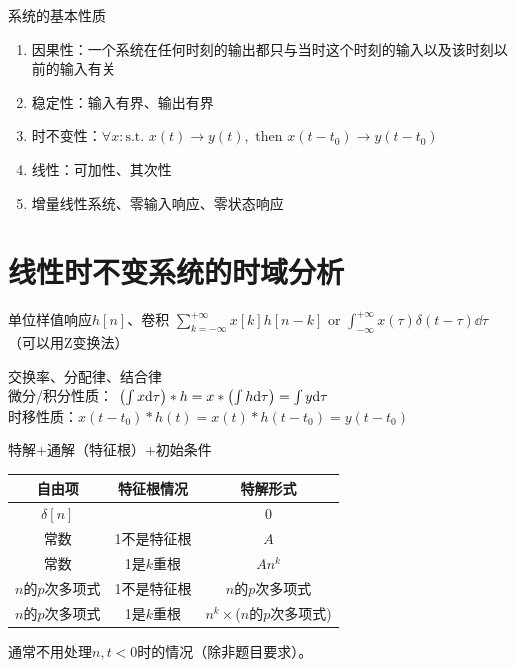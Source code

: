 \documentclass{article}
\begin{document}
\begin{prt}系统的基本性质
	\begin{enumerate}
		\item 因果性：一个系统在任何时刻的输出都只与当时这个时刻的输入以及该时刻以前的输入有关
		\item 稳定性：输入有界、输出有界
		\item 时不变性：$\forall x:\mbox{s.t. }x(t)\to y(t),\mbox{ then } x(t-t_0)\to y(t-t_0)$
		\item 线性：可加性、其次性
		\item 增量线性系统、零输入响应、零状态响应
	\end{enumerate}
\end{prt}









\section{线性时不变系统的时域分析}

\begin{defi}
	单位样值响应$h[n]$、卷积
	$\sum_{k=-\infty}^{+\infty}x[k]h[n-k]$ or 
	$\int_{-\infty}^{+\infty}x(\tau)\delta(t-\tau)\dd\tau$
	（可以用Z变换法）
\end{defi}

\begin{prt}[卷积]
    交换率、分配律、结合律\\
	微分/积分性质：
	$\qty(\int x\dd\tau)*h=x*\qty(\int h\dd\tau)=\int y\dd\tau$\\
	时移性质：$x(t-t_0)*h(t)=x(t)*h(t-t_0)=y(t-t_0)$
\end{prt}

\begin{thm}
    特解+通解（特征根）+初始条件
	\begin{table}[H]
		\centering
		\begin{tabular}{c|c|c}
			自由项 & 特征根情况 & 特解形式 \\ \hline
			$\delta[n]$ & & 0 \\
			常数 & 1不是特征根 & $A$\\
			常数 & 1是$k$重根 & $An^k$\\
			$n$的$p$次多项式 & 1不是特征根 & $n$的$p$次多项式\\
			$n$的$p$次多项式 & 1是$k$重根 & $n^k\times$($n$的$p$次多项式)
		\end{tabular}
	\end{table}
	通常不用处理$n,t<0$时的情况（除非题目要求）。
\end{thm}
\end{document}
